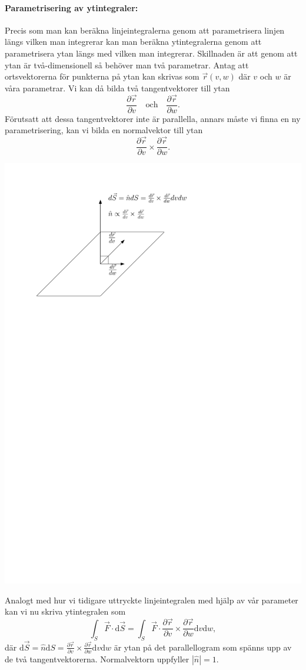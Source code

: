 \documentclass[%
oneside,                 %
final,                   %
10pt]{article}
\begin{document}
\paragraph{Parametrisering av ytintegraler:}
Precis som man kan beräkna linjeintegralerna genom att parametrisera linjen längs vilken man integrerar kan man beräkna ytintegralerna genom att parametrisera ytan längs med vilken man integrerar.  Skillnaden är att genom att ytan är två-dimensionell så behöver man två parametrar. Antag att ortsvektorerna för punkterna på ytan kan skrivas som $\vec{r}(v,w)$ där $v$ och $w$ är våra parametrar.  Vi kan då bilda två tangentvektorer till ytan
\begin{equation}
  \frac{\partial \vec{r}}{\partial v} \quad \mathrm{och} \quad
\frac{\partial \vec{r}}{\partial w}.
\end{equation}
Förutsatt att dessa tangentvektorer inte är parallella, annars måste vi finna en ny parametrisering, kan vi bilda en normalvektor till ytan
\begin{equation}
  \frac{\partial \vec{r}}{\partial v} \times \frac{\partial \vec{r}}{\partial w}.
\end{equation}



\centerline{\includegraphics[width=0.6\linewidth]{fig/ytparametrisering.pdf}}



Analogt med hur vi tidigare uttryckte linjeintegralen med hjälp av vår parameter kan vi nu skriva ytintegralen som
\begin{equation}
  \int_S \vec{F} \cdot \mbox{d}\vec{S} = \int_S \vec{F} \cdot 
\frac{\partial \vec{r}}{\partial v} \times \frac{\partial \vec{r}}{\partial w}
\mbox{d}v \mbox{d}w,
\end{equation}
där $\mbox{d}\vec{S} = \hat{n} \mbox{d}S = \frac{\partial \vec{r}}{\partial v} \times \frac{\partial \vec{r}}{\partial w} \mbox{d}v \mbox{d}w$ är ytan på det parallellogram som spänns upp av de två tangentvektorerna. Normalvektorn uppfyller $|\hat{n}|=1$.
\end{document}
